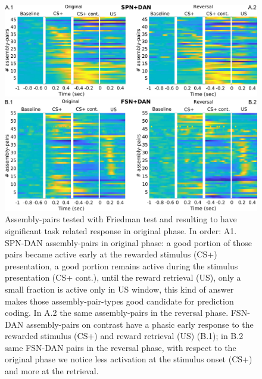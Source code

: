  \begin{figure}
     \centering
     \includegraphics[scale=0.36]{figures/HeatSPN_DAN.pdf}
     
     \vspace{1cm}
     
     \includegraphics[scale=0.36]{figures/HeatFSN_DAN.pdf}
     \caption{Assembly-pairs tested with Friedman test and resulting to have significant task related response in original phase. In order: A1. SPN-DAN assembly-pairs in original phase: a good portion of those pairs became active early at the rewarded stimulus (CS+) presentation, a good portion remains active during the stimulus presentation (CS+ cont.), until the reward retrieval (US), only a small fraction is active only in US window, this kind of answer makes those assembly-pair-types good candidate for prediction coding. In A.2 the same assembly-pairs in the reversal phase. FSN-DAN assembly-pairs on contrast have a phasic early response to the rewarded stimulus (CS+) and reward retrieval (US) (B.1); in B.2 same FSN-DAN pairs in the reversal phase, with respect to the original phase we notice less activation at the stimulus onset (CS+) and more at the retrieval.}
     \label{fig:HeatPairsDan}
 \end{figure}
